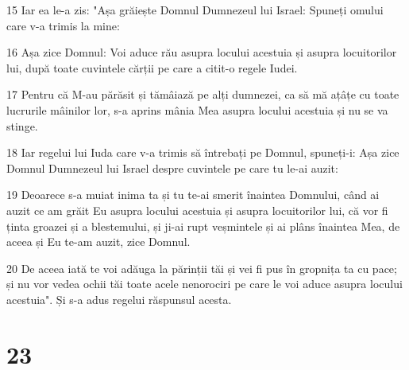 \par 15 Iar ea le-a zis: "Așa grăiește Domnul Dumnezeul lui Israel: Spuneți omului care v-a trimis la mine:
\par 16 Așa zice Domnul: Voi aduce rău asupra locului acestuia și asupra locuitorilor lui, după toate cuvintele cărții pe care a citit-o regele Iudei.
\par 17 Pentru că M-au părăsit și tămâiază pe alți dumnezei, ca să mă ațâțe cu toate lucrurile mâinilor lor, s-a aprins mânia Mea asupra locului acestuia și nu se va stinge.
\par 18 Iar regelui lui Iuda care v-a trimis să întrebați pe Domnul, spuneți-i: Așa zice Domnul Dumnezeul lui Israel despre cuvintele pe care tu le-ai auzit:
\par 19 Deoarece s-a muiat inima ta și tu te-ai smerit înaintea Domnului, când ai auzit ce am grăit Eu asupra locului acestuia și asupra locuitorilor lui, că vor fi ținta groazei și a blestemului, și ji-ai rupt veșmintele și ai plâns înaintea Mea, de aceea și Eu te-am auzit, zice Domnul.
\par 20 De aceea iată te voi adăuga la părinții tăi și vei fi pus în gropnița ta cu pace; și nu vor vedea ochii tăi toate acele nenorociri pe care le voi aduce asupra locului acestuia". Și s-a adus regelui răspunsul acesta.

\chapter{23}

